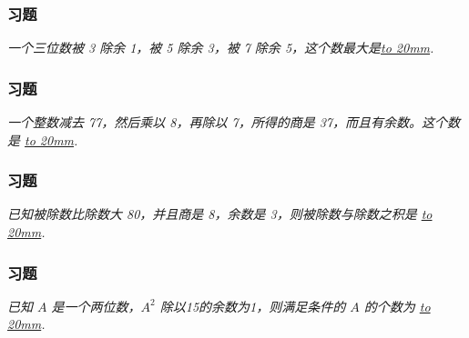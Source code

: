 \begin{frame}
    \frametitle{习题\theframecounter}
    \vspace*{-3cm}
    \textit{一个三位数被 3 除余 1，被 5 除余 3，被 7 除余 5，这个数最大是\underline{\hbox to 20mm{}}.} %
\end{frame}

\begin{frame}
    \frametitle{习题\theframecounter}
    \vspace*{-3cm}
    \textit{一个整数减去 77，然后乘以 8，再除以 7，所得的商是 37，而且有余数。这个数是 \underline{\hbox to 20mm{}}.} %
\end{frame}

\begin{frame}
    \frametitle{习题\theframecounter}
    \vspace*{-3cm}
    \textit{已知被除数比除数大 80，并且商是 8，余数是 3，则被除数与除数之积是 \underline{\hbox to 20mm{}}.} %
\end{frame}

\begin{frame}
    \frametitle{习题\theframecounter}
    \vspace*{-3cm}
    \textit{已知 $A$ 是一个两位数，$A^2$ 除以15的余数为1，则满足条件的 $A$ 的个数为 \underline{\hbox to 20mm{}}.} 
\end{frame}
